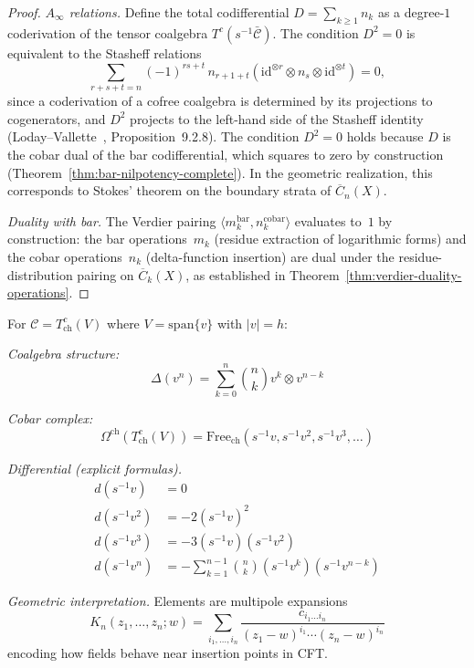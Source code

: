 \begin{proof}
\emph{$A_\infty$ relations.}
Define the total codifferential $D = \sum_{k \geq 1} n_k$ as a
degree-$1$ coderivation of the tensor coalgebra
$T^c(s^{-1}\bar{\mathcal{C}})$.  The condition $D^2 = 0$ is equivalent
to the Stasheff relations
\[
\sum_{r+s+t=n} (-1)^{rs+t}\, n_{r+1+t}(\mathrm{id}^{\otimes r}
\otimes n_s \otimes \mathrm{id}^{\otimes t}) = 0,
\]
since a coderivation
of a cofree coalgebra is determined by its projections to cogenerators,
and $D^2$ projects to the left-hand side of the Stasheff identity
(Loday--Vallette~\cite{LV12}, Proposition~9.2.8).  The condition $D^2 = 0$
holds because $D$ is the cobar dual of the bar codifferential, which
squares to zero by construction
(Theorem~\ref{thm:bar-nilpotency-complete}).  In the geometric
realization, this corresponds to Stokes' theorem on the boundary
strata of $\overline{C}_n(X)$.

\emph{Duality with bar.}
The Verdier pairing $\langle m_k^{\mathrm{bar}}, n_k^{\mathrm{cobar}} \rangle$ evaluates to~$1$ by construction: the bar operations~$m_k$ (residue extraction of logarithmic forms) and the cobar operations~$n_k$ (delta-function insertion) are dual under the residue-distribution pairing on $\overline{C}_k(X)$, as established in Theorem~\ref{thm:verdier-duality-operations}.
\end{proof}

\begin{example}
For $\mathcal{C} = T^c_{\text{ch}}(V)$ where $V = \text{span}\{v\}$ with $|v| = h$:

\emph{Coalgebra structure:}
\[\Delta(v^n) = \sum_{k=0}^n \binom{n}{k} v^k \otimes v^{n-k}\]

\emph{Cobar complex:}
\[\Omega^{\text{ch}}(T^c_{\text{ch}}(V)) = \text{Free}_{\text{ch}}(s^{-1}v, s^{-1}v^2, s^{-1}v^3, \ldots)\]

\emph{Differential (explicit formulas).}
\begin{align}
d(s^{-1}v) &= 0 \\
d(s^{-1}v^2) &= -2(s^{-1}v)^2 \\
d(s^{-1}v^3) &= -3(s^{-1}v)(s^{-1}v^2) \\
d(s^{-1}v^n) &= -\sum_{k=1}^{n-1} \binom{n}{k}(s^{-1}v^k)(s^{-1}v^{n-k})
\end{align}

\emph{Geometric interpretation.} Elements are multipole expansions
\[K_n(z_1, \ldots, z_n; w) = \sum_{i_1, \ldots, i_n} \frac{c_{i_1\ldots i_n}}{(z_1 - w)^{i_1} \cdots (z_n - w)^{i_n}}\]
encoding how fields behave near insertion points in CFT.
\end{example}



